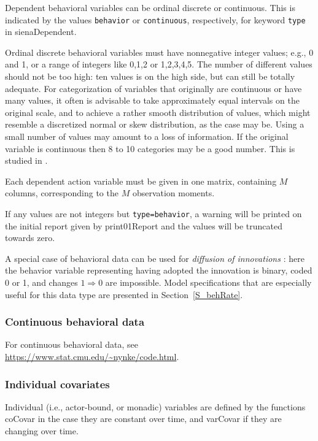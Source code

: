 \documentclass[a4paper,fleqn,11pt]{article}
\newcommand{\+}{\, + \,}
\newcommand{\sfn}[1]{\textsf{#1}}
\begin{document}
Dependent behavioral variables can be ordinal discrete or continuous.
This is indicated by the values \texttt{behavior}  or \texttt{continuous},
respectively, for keyword \texttt{type} in \sfn{sienaDependent}.

Ordinal discrete behavioral variables must have nonnegative integer values;
e.g., 0 and 1, or a range of integers like 0,1,2 or 1,2,3,4,5.
The number of different values should not be too high: ten values
is on the high side, but can still be totally adequate.
For categorization of variables that originally are
continuous or have many values, it often is advisable to take
approximately equal intervals on the original scale, and to achieve
a rather smooth distribution of values, which might resemble a
discretized normal or skew distribution, as the case may be.
Using a small number of values may amount to a loss of information.
If the original variable is continuous then 8 to 10 categories may be
a good number. This is studied in \citet[][Chapter 6]{Niezink2018a}.

Each dependent action variable must be given in one
matrix, containing $M$ columns, corresponding to the $M$
observation moments.

If any values are not integers but \texttt{type=behavior},
a warning will be printed on the initial report
given by \sfn{print01Report} and the values will be truncated towards zero.

A special case of behavioral data can be used for
\emph{diffusion of innovations} \citep{Greenan15}:
here the behavior variable representing
having adopted the innovation is binary, coded 0 or 1, and
changes $1 \Rightarrow 0$ are impossible.
Model specifications that are especially useful for this data type
are presented in Section~\ref{S_behRate}.


\subsubsection{Continuous behavioral data}

For continuous behavioral data,
see \url{https://www.stat.cmu.edu/~nynke/code.html}.


\subsubsection{Individual covariates}
\label{S_covariates}

Individual (i.e., actor-bound, or monadic) variables
are defined by the functions
\sfn{coCovar} in the case they are constant over time,
and \sfn{varCovar} if they are changing over time.
\end{document}
